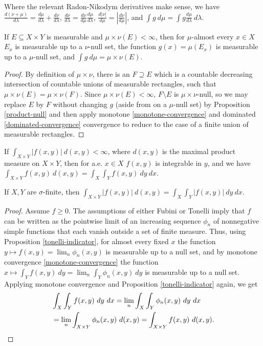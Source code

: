 \documentclass[letterpaper,11pt]{report}
\begin{document}
\begin{prop} Where the relevant Radon-Nikodym derivatives make sense, we have $\frac{d(\nu+\mu)}{d\lambda} = \frac{d\mu}{d\lambda} + \frac{d\nu}{d\lambda}$, $\frac{d\nu}{d\lambda} = \frac{d\nu}{d\mu} \frac{d\mu}{d\lambda}$, $\frac{d|\nu|}{d\mu} = |\frac{d\nu}{d\mu}|$, and $\int g\ d\mu = \int g\frac{d\mu}{d\lambda}\ d\lambda$.
\end{prop}

\begin{prop}\label{tonelli-indicator} If $E \subseteq X\times Y$ is measurable and $\mu\times\nu(E) < \infty$, then for $\mu$-almost every $x \in X$ $E_x$ is measurable up to a $\nu$-null set, the function $g(x) = \mu(E_x)$ is measurable up to a $\mu$-null set, and $\int g\ d\mu = \mu\times\nu(E)$.
\end{prop}
\begin{proof} By definition of $\mu\times\nu$, there is an $F \supseteq E$ which is a countable decreasing intersection of countable unions of measurable rectangles, such that $\mu\times\nu(E) = \mu\times\nu(F)$. Since $\mu\times\nu(E) < \infty$, $F\setminus E$ is $\mu\times\nu$-null, so we may replace $E$ by $F$ without changing $g$ (aside from on a $\mu$-null set) by Proposition \ref{product-null} and then apply monotone \ref{monotone-convergence} and dominated \ref{dominated-convergence} convergence to reduce to the case of a finite union of measurable rectangles.
\end{proof}

\begin{thm}\label{fubini} If $\int_{X\times Y} |f(x,y)|\ d(x,y) < \infty$, where $d(x,y)$ is the maximal product measure on $X\times Y$, then for a.e. $x\in X$ $f(x,y)$ is integrable in $y$, and we have $\int_{X\times Y} f(x,y)\ d(x,y) = \int_X \int_Y f(x,y)\ dy\ dx$.
\end{thm}

\begin{thm}\label{tonelli} If $X,Y$ are $\sigma$-finite, then $\int_{X\times Y} |f(x,y)|\ d(x,y) = \int_X \int_Y |f(x,y)|\ dy\ dx$.
\end{thm}
\begin{proof} Assume $f \ge 0$. The assumptions of either Fubini or Tonelli imply that $f$ can be written as the pointwise limit of an increasing sequence $\phi_n$ of nonnegative simple functions that each vanish outside a set of finite measure. Thus, using Proposition \ref{tonelli-indicator}, for almost every fixed $x$ the function $y\mapsto f(x,y) = \lim_n \phi_n(x,y)$ is measurable up to a null set, and by monotone convergence \ref{monotone-convergence} the function $x \mapsto \int_Y f(x,y)\ dy = \lim_n \int_Y \phi_n(x,y)\ dy$ is measurable up to a null set. Applying monotone convergence and Proposition \ref{tonelli-indicator} again, we get
\begin{align*}
&\int_X\int_Yf(x,y)\ dy\ dx = \lim_n \int_X\int_Y\phi_n(x,y)\ dy\ dx\\
&= \lim_n \int_{X\times Y}\phi_n(x,y)\ d(x,y) = \int_{X\times Y}f(x,y)\ d(x,y).\qedhere
\end{align*}
\end{proof}
\end{document}

